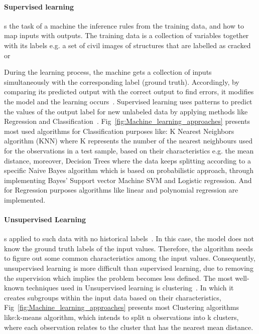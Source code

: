 \paragraph{Supervised learning}
s the task of   a machine the inference rules from the training data, and how to map inputs with outputs.
The training data is a collection of variables together with its labels e.g. a set of civil images of structures that are labelled as cracked or  

During the learning process, the machine gets a collection of inputs simultaneously with the corresponding label (ground truth).
Accordingly, by comparing its predicted output with the correct output to find errors, it modifies the model and the learning occurs~\cite{Ongsulee2018}. 
Supervised learning uses patterns to predict the values of the output label  for new unlabeled data by applying methods like Regression and Classification~\cite{Ongsulee2018}. Fig~\ref{fig:Machine_learning_approaches} presents most used algorithms for Classification purposes like: K Nearest Neighbors algorithm (KNN) where K represents the number of the nearest neighbours used for   the observations in a test sample, based on their characteristics e.g. the mean distance, moreover, Decision Trees where the data keeps splitting according to a specific   Naive Bayes algorithm which is based on probabilistic approach, through implementing Bayes'   Support vector Machine SVM and Logistic regression. And for Regression purposes algorithms like linear and polynomial regression are implemented.

\paragraph{Unsupervised Learning}
s applied to such data with no historical labels~\cite{Ongsulee2018}. 
In this case, the model does not know the ground truth labels of the input values. Therefore, the algorithm needs to figure out some common characteristics among the input values.
Consequently, unsupervised learning is more difficult than supervised learning, due to removing the supervision which implies the problem becomes less defined.
The most well-known techniques used in Unsupervised learning is clustering~\cite{Russell2010}. In which it creates subgroups within the input data based on their characteristics, Fig~\ref{fig:Machine_learning_approaches} presents most Clustering algorithms like:k-means algorithm, which intends to split n observations into k clusters, where each observation relates to the cluster that has the nearest mean distance.   

